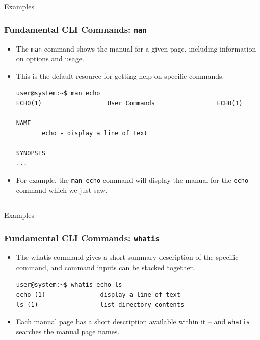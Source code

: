 \documentclass[10pt]{beamer}
\begin{document}
\subsection{}
\begin{frame}[fragile]{Examples}
\frametitle{Fundamental CLI Commands: \texttt{man}}
\begin{itemize}
\item The \texttt{man} command shows the manual for a given page, including information on options and usage.\vspace{0.1in}
\item This is the default resource for getting help on specific commands.\vspace{0.1in}
\begin{lstlisting}[style=BashInputStyle]
user@system:~$ man echo
ECHO(1)                  User Commands                 ECHO(1)

NAME
       echo - display a line of text

SYNOPSIS
...
\end{lstlisting}
\item For example, the \texttt{man echo} command will display the manual for the \texttt{echo} command which we just saw.\\
\end{itemize}
\end{frame}


\subsection{}
\begin{frame}[fragile]{Examples}
\frametitle{Fundamental CLI Commands: \texttt{whatis}}
\begin{itemize}
\item The whatis command gives a short summary description of the specific command, and command inputs can be stacked together. \vspace{0.2in}
\begin{lstlisting}[style=BashInputStyle]
user@system:~$ whatis echo ls
echo (1)             - display a line of text
ls (1)               - list directory contents
\end{lstlisting}
\vspace{0.1in}
\item Each manual page has a short description available within it -- and \texttt{whatis} searches the manual page names.
\end{itemize}
\end{frame}
\end{document}
